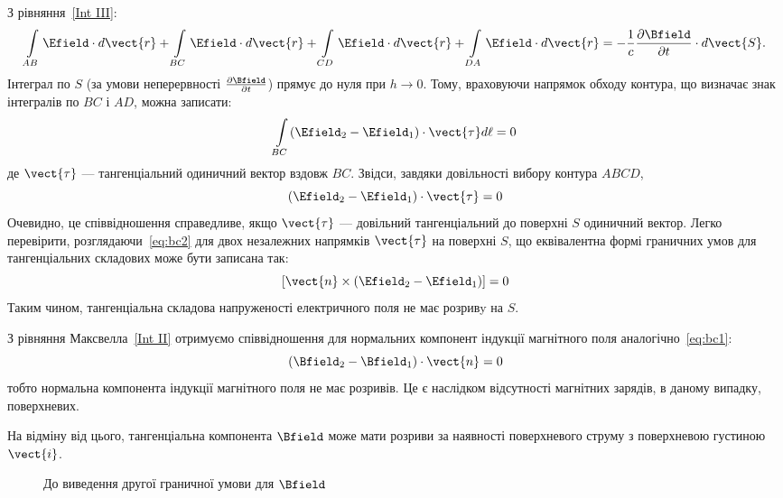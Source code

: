 З рівняння~\eqref{Int III}:
\begin{equation*}
	\int\limits_{AB} \Efield\cdot d\vect{r} + \int\limits_{BC} \Efield\cdot d\vect{r} + \int\limits_{CD} \Efield\cdot d\vect{r} + \int\limits_{DA}
	\Efield\cdot d\vect{r} =
	-\frac1c \frac{\partial\Bfield}{\partial t}\cdot d\vect{S}.
\end{equation*}
Інтеграл по $S$ (за умови неперервності $\frac{\partial\Bfield}{\partial t}$) прямує до нуля при $h\to0$.
Тому, враховуючи напрямок обходу контура, що визначає знак інтегралів по
$BC$ і $AD$, можна записати:
\begin{equation*}
	\int\limits_{BC} (\Efield_2 - \Efield_1)\cdot\vect{\tau} d\ell = 0
\end{equation*}
де $\vect{\tau}$ --- тангенціальний одиничний вектор вздовж $BC$. Звідси, завдяки
довільності вибору контура $ABCD$,
\begin{equation}\label{eq:bc2}
	(\Efield_2 - \Efield_1)\cdot\vect{\tau} = 0
\end{equation}
Очевидно, це співвідношення справедливе, якщо $\vect{\tau}$ --- довільний тангенціальний до поверхні $S$ одиничний вектор.
Легко перевірити, розглядаючи~\eqref{eq:bc2} для двох незалежних напрямків $\vect{\tau}$ на
поверхні $S$, що еквівалентна формі граничних умов для тангенціальних
складових може бути записана так:
\begin{equation*}
	\left[ \vect{n}\times (\Efield_2 - \Efield_1)\right] = 0
\end{equation*}
Таким чином, тангенціальна складова напруженості електричного поля не
має розривy на $S$.

З рівняння Максвелла~\eqref{Int II} отримуємо співвідношення для нормальних
компонент індукції магнітного поля аналогічно~\eqref{eq:bc1}:
\begin{equation}
	(\Bfield_2 - \Bfield_1)\cdot\vect{n} = 0
\end{equation}
тобто нормальна компонента індукції магнітного поля не має розривів. Це є
наслідком відсутності магнітних зарядів, в даному випадку, поверхневих.

На відміну від цього, тангенціальна компонента $\Bfield$ може
мати розриви за наявності поверхневого струму з поверхневою густиною~$\vect{i}$.

\begin{figure}
	\centering
	\caption{До виведення другої граничної умови для $\Bfield$}%
	\label{tikz:bc2m}
\end{figure}

